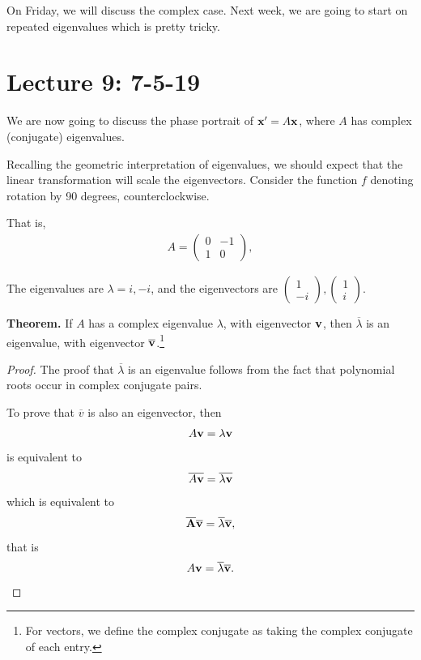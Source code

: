 \documentclass{article}
\newcommand{\ol}{\overline}
\newcommand{\mat}[1]{\begin{pmatrix}#1\end{pmatrix}}
\begin{document}
On Friday, we will discuss the complex case.  Next week, we are going to start on repeated eigenvalues which is pretty tricky.

\section{Lecture 9: 7-5-19}

We are now going to discuss the phase portrait of $\mathbf{x}' = A \mathbf{x}$, where $A$ has complex (conjugate) eigenvalues.

Recalling the geometric interpretation of eigenvalues, we should expect that the linear transformation will scale the eigenvectors. Consider the function $f$ denoting rotation by 90 degrees, counterclockwise.  

That is,
\begin{align*}
  A = \mat{0 & -1 \\ 1 & 0},
\end{align*}

The eigenvalues are $\lambda = i, -i$, and the eigenvectors are $\mat{1 \\ -i}, \mat{1 \\ i}$.


{\bf Theorem.} If $A$ has a complex eigenvalue $\lambda$, with eigenvector $\mathbf{v}$, then $\ol{\lambda}$ is an eigenvalue, with eigenvector $\ol{\mbf{v}}$.\footnote{For vectors, we define the complex conjugate as taking the complex conjugate of each entry.}

\begin{proof}
  The proof that $\ol{\lambda}$ is an eigenvalue follows from the fact that polynomial roots occur in complex conjugate pairs.

  To prove that $\ol{v}$ is also an eigenvector, then
  \begin{align*}
    A \mathbf{v} = \lambda \mathbf{v}
  \end{align*}
  is equivalent to
  \begin{align*}
    \ol{A \mbf{v}} = \ol{\lambda \mbf{v}}
  \end{align*}
  which is equivalent to
  \begin{align*}
  \ol{\mbf{A}} \ol{\mbf{v}} = \ol{\lambda} \ol{\mbf{v}},
  \end{align*}
  that is
  \begin{align*}
    A \mbf{v} = \ol{\lambda} \ol{\mbf{v}}.
  \end{align*}
\end{proof}
\end{document}
